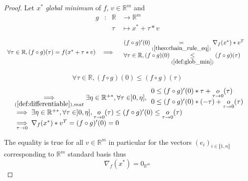 \documentclass[11pt,en]{elegantpaper}
\newcommand{\Real}{\mathbb{R}}
\begin{document}
\begin{proof}
  Let $x^*$ \textit{global minimum} of $f$, $v \in \Real^m$ and \begin{equation*}
    \begin{array}{llll}
      g & : & \Real & \longrightarrow \Real^m \\
      & & \tau & \longmapsto x^* + \tau * v
    \end{array}
  \end{equation*}

  \begin{equation*}
    \begin{array}{lll}
      \forall \tau \in \Real, (f \circ g)(\tau) = f(x^* + \tau * v) & \implies & \begin{array}{l}
        (f \circ g)'(0) \underset{(\ref{theo:chain_rule_eq})}{=} \nabla_f(x^*) * v^T \\
        \forall \tau \in \Real, (f \circ g)(0) \underset{(\ref{def:glob_min})}{\leq} (f \circ g)(\tau)
      \end{array}
    \end{array}
  \end{equation*}

  \begin{equation*}
    \begin{gathered}
      \forall \tau \in \Real, (f \circ g)(0) \leq (f \circ g)(\tau) 
      \end{gathered}
  \end{equation*}
  \begin{equation*}
    \begin{array}{ll}
      & \underset{(\ref{def:differentiable}),mat}\implies \exists \eta \in \Real^{+*}, \forall \tau \in ]0,\eta], \begin{array}{l}
        0 \leq (f \circ g)'(0) * \tau + \underset{\tau \to 0}{o} (\tau) \\
        0 \leq (f \circ g)'(0) * (- \tau) + \underset{\tau \to 0}{o} (\tau)
      \end{array} \\
      & \implies \exists \eta \in \Real^{+*}, \forall \tau \in ]0,\eta], \underset{\tau \to 0}{o} (\tau) \leq (f \circ g)'(0) \leq \underset{\tau \to 0}{o} (\tau) \\
      & \underset{\tau \to 0}\implies \nabla_f(x^*) * v^T = (f \circ g)'(0) = 0
    \end{array}
  \end{equation*} \par

  The equality is true for all $v \in \Real^m$
  in particular for the vectors $(e_i)_{i \in \llbracket 1,n \rrbracket}$ corresponding to $\Real^m$ standard basis thus \begin{equation*}
    \nabla_f(x^*) = 0_{\Real^m}
  \end{equation*}
\end{proof}
\end{document}
